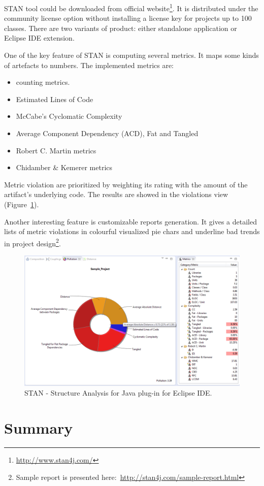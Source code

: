 STAN tool could be downloaded from official website\footnote{\url{http://www.stan4j.com/}}. It is distributed under the community license option without installing a license key for projects up to 100 classes. There are two variants of product: either standalone application or Eclipse IDE extension.

One of the key feature of STAN is computing several metrics. It maps some kinds of artefacts to numbers. The implemented metrics are:

\begin{itemize}
\item counting metrics.
\item Estimated Lines of Code
\item McCabe's Cyclomatic Complexity
\item Average Component Dependency (ACD), Fat and Tangled
\item Robert C. Martin metrics
\item Chidamber \& Kemerer metrics
\end{itemize}

Metric violation are prioritized  by weighting its rating with the amount of the artifact's underlying code. The results are showed in the violations view (Figure~\ref{fig:stan}).

Another interesting feature is customizable reports generation. It gives a detailed lists of metric violations in colourful visualized pie chars and underline bad trends in project design\footnote{Sample report is presented here:~\url{http://stan4j.com/sample-report.html}}\cite{stan}.

\begin{figure}[h!]
	\centering
	\includegraphics[scale=0.55]{img/stan.png} 
	\caption{STAN - Structure Analysis for Java plug-in for Eclipse IDE.}		
	\label{fig:stan}
\end{figure}



\section{Summary}


